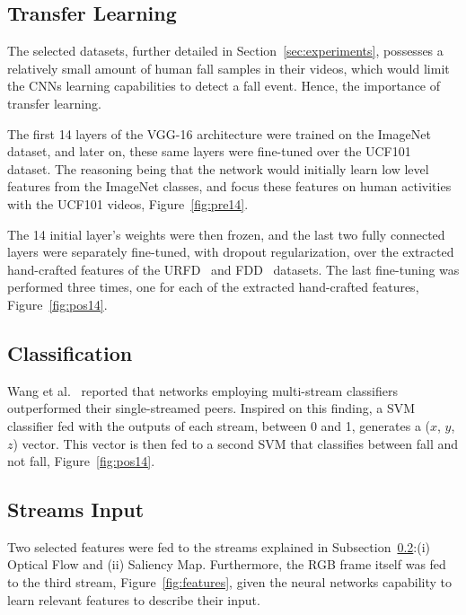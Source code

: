 \documentclass[conference]{IEEEtran}
\begin{document}
\subsection{Transfer Learning}

The selected datasets, further detailed in Section~\ref{sec:experiments}, possesses a relatively small amount of human fall samples in their videos, which would limit the CNNs learning capabilities to detect a fall event. Hence, the importance of transfer learning.

The first 14 layers of the VGG-16 architecture were trained on the ImageNet~\cite{imagenet_cvpr09} dataset, and later on, these same layers were fine-tuned over the UCF101~\cite{soomro2012ucf101} dataset. The reasoning being that the network would initially learn low level features from the ImageNet classes, and focus these features on human activities with the UCF101 videos, Figure~\ref{fig:pre14}.

The 14 initial layer's weights were then frozen, and the last two fully connected layers were separately fine-tuned, with dropout regularization, over the extracted hand-crafted features of the URFD~\cite{kepski2014human} and FDD~\cite{charfi2013optimised} datasets. The last fine-tuning was performed three times, one for each of the extracted hand-crafted features, Figure~\ref{fig:pos14}.

\subsection{Classification}
\label{sec:classification}

Wang et al.~\cite{wang2015towards} reported that networks employing multi-stream classifiers outperformed their single-streamed peers. Inspired on this finding, a SVM classifier fed with the outputs of each stream, between 0 and 1, generates a ($x$, $y$, $z$) vector. This vector is then fed to a second SVM that classifies between fall and not fall, Figure~\ref{fig:pos14}.

\subsection{Streams Input}

Two selected features were fed to the streams explained in Subsection~\ref{sec:classification}:(i) Optical Flow and (ii) Saliency Map. Furthermore, the RGB frame itself was fed to the third stream, Figure~\ref{fig:features}, given the neural networks capability to learn relevant features to describe their input.
\end{document}
